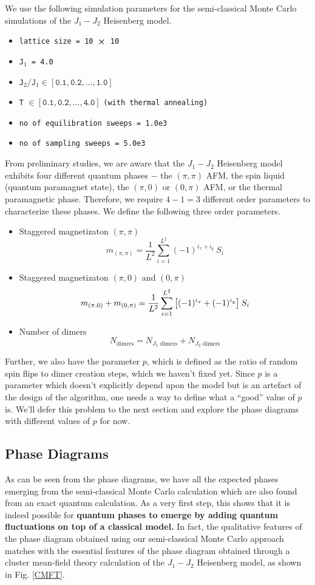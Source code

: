 \documentclass[../thesis_main.tex]{subfiles}
\begin{document}
We use the following simulation parameters for the semi-classical Monte Carlo simulations of the $J_1-J_2$ Heisenberg model.
\begin{itemize}[label={}] 
    \setlength{\itemsep}{0.1em}   
    \item \texttt{lattice size = 10 $\cross$ 10}
    \item \texttt{J${}_1$ = 4.0}
    \item \texttt{J${}_2/\texttt{J}_1 \in [\texttt{0.1}, \texttt{0.2}, \ldots, \texttt{1.0}]$ }
    \item \texttt{T} $\in [\texttt{0.1}, \texttt{0.2}, \ldots, \texttt{4.0}]$ \texttt{(with thermal annealing)}
    \item \texttt{no of equilibration sweeps = 1.0e3}
    \item \texttt{no of sampling sweeps = 5.0e3}
\end{itemize}
From preliminary studies, we are aware that the $J_1 - J_2$ Heisenberg model exhibits four different quantum phases $-$ the $(\pi, \pi)$ AFM, the spin liquid (quantum paramagnet state), the $(\pi, 0)$ or $(0, \pi)$ AFM, or the thermal paramagnetic phase. Therefore, we require $4 - 1 = 3$ different order parameters to characterize these phases. We define the following three order parameters.
\begin{itemize}
    \setlength{\itemsep}{0.1em}   
    \item Staggered magnetizaton $(\pi, \pi)$ 
    \[ 
        m_{(\pi, \pi)} = \frac{1}{L^2} \sum_{i = 1}^{L^2} (-1)^{i_{x} + i_{y}}\: S_i
    \]
    \item Staggered magnetizaton $(\pi, 0)$ and $(0, \pi)$  
    \[ 
        m_{(\pi, 0)} +  m_{(0, \pi)} = \frac{1}{L^2} \sum_{i = 1}^{L^2} \qty[(-1)^{i_{x}} + (-1)^{i_{y}}] \: S_i 
    \]
    \item Number of dimers
    \[
        N_\text{dimers} = N_{J_1 \text{ dimers}} + N_{J_2 \text{ dimers}}
    \]
\end{itemize}
Further, we also have the parameter $p$, which is defined as the ratio of random spin flips to dimer creation steps, which we haven't fixed yet. Since $p$ is a parameter which doesn't explicitly depend upon the model but is an artefact of the design of the algorithm, one needs a way to define what a ``good'' value of $p$ is. We'll defer this problem to the next section and explore the phase diagrams with different values of $p$ for now.
\subsection{Phase Diagrams}
As can be seen from the phase diagrams, we have all the expected phases emerging from the semi-classical Monte Carlo calculation which are also found from an exact quantum calculation. As a very first step, this shows that it is indeed possible for \textbf{quantum phases to emerge by adding quantum fluctuations on top of a classical model.} In fact, the qualitative features of the phase diagram obtained using our semi-classical Monte Carlo approach matches with the essential features of the phase diagram obtained through a cluster mean-field theory calculation of the $J_1-J_2$ Heisenberg model, as shown in Fig. \ref{CMFT}. 
\end{document}
